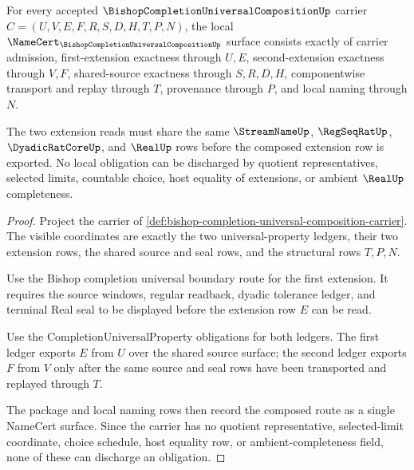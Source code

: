 \begin{theorem}
\label{thm:bishop-completion-universal-composition-obligations}
For every accepted $\BishopCompletionUniversalCompositionUp$ carrier $C=(U,V,E,F,R,S,D,H,T,P,N)$, the local $\NameCert_{\BishopCompletionUniversalCompositionUp}$ surface consists exactly of carrier admission, first-extension exactness through $U,E$, second-extension exactness through $V,F$, shared-source exactness through $S,R,D,H$, componentwise transport and replay through $T$, provenance through $P$, and local naming through $N$.

The two extension reads must share the same $\StreamNameUp$, $\RegSeqRatUp$, $\DyadicRatCoreUp$, and $\RealUp$ rows before the composed extension row is exported. No local obligation can be discharged by quotient representatives, selected limits, countable choice, host equality of extensions, or ambient $\RealUp$ completeness.
\end{theorem}
\begin{proof}
Project the carrier of \autoref{def:bishop-completion-universal-composition-carrier}. The visible coordinates are exactly the two universal-property ledgers, their two extension rows, the shared source and seal rows, and the structural rows $T,P,N$.

Use the Bishop completion universal boundary route for the first extension. It requires the source windows, regular readback, dyadic tolerance ledger, and terminal Real seal to be displayed before the extension row $E$ can be read.

Use the CompletionUniversalProperty obligations for both ledgers. The first ledger exports $E$ from $U$ over the shared source surface; the second ledger exports $F$ from $V$ only after the same source and seal rows have been transported and replayed through $T$.

The package and local naming rows then record the composed route as a single NameCert surface. Since the carrier has no quotient representative, selected-limit coordinate, choice schedule, host equality row, or ambient-completeness field, none of these can discharge an obligation.
\end{proof}

